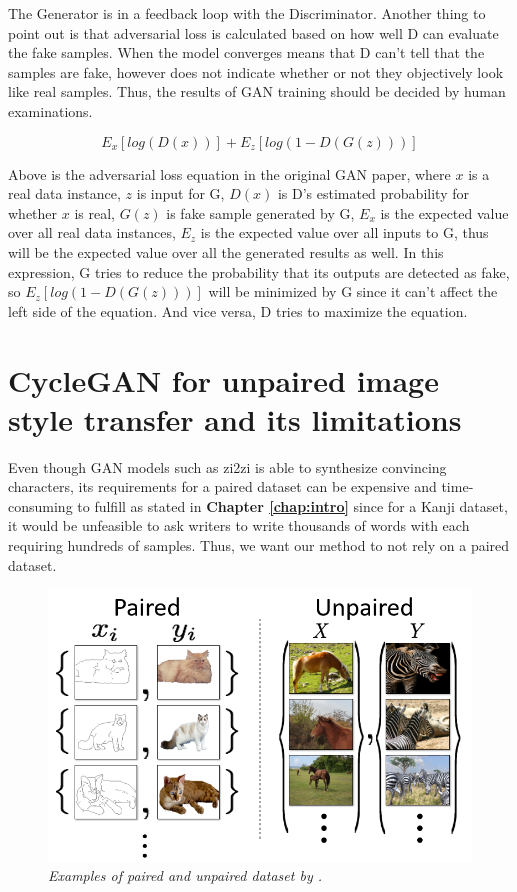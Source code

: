\documentclass[12pt]{report}
\begin{document}
The Generator is in a feedback loop with the Discriminator. Another thing to point out is that adversarial loss is calculated based on how well D can evaluate the fake samples. When the model converges means that D can't tell that the samples are fake, however does not indicate whether or not they objectively look like real samples. Thus, the results of GAN training should be decided by human examinations.

\[E_x[log(D(x))] + E_z[log(1 - D(G(z)))]\]

Above is the adversarial loss equation in the original GAN paper, where $x$ is a real data instance, $z$ is input for G, $D(x)$ is D's estimated probability for whether $x$ is real, $G(z)$ is fake sample generated by G, $E_x$ is the expected value over all real data instances, $E_z$ is the expected value over all inputs to G, thus will be the expected value over all the generated results as well. In this expression, G tries to reduce the probability that its outputs are detected as fake, so $E_z[log(1-D(G(z)))]$ will be minimized by G since it can't affect the left side of the equation. And vice versa, D tries to maximize the equation.

\section{CycleGAN for unpaired image style transfer and its limitations}

Even though GAN models such as zi2zi \cite{zi2zi} is able to synthesize convincing characters, its requirements for a paired dataset can be expensive and time-consuming to fulfill as stated in \textbf{Chapter \ref{chap:intro}} since for a Kanji dataset, it would be unfeasible to ask writers to write thousands of words with each requiring hundreds of samples. Thus, we want our method to not rely on a paired dataset.

\begin{figure}[H]
	\centering
	\includegraphics[scale=0.8]{pair-unpair-dataset}
	\caption{\textit{Examples of paired and unpaired dataset by \cite{cycle-gan}.}}
	\label{fig:pair-unpair-dataset}
\end{figure}
\end{document}
